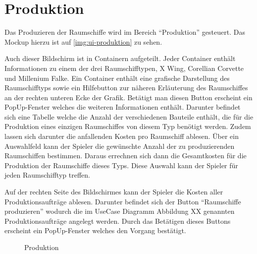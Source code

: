 \section{Produktion}
\label{sec:ui-produktion}

Das Produzieren der Raumschiffe wird im Bereich “Produktion” gesteuert. Das Mockup hierzu ist auf \vref{img:ui-produktion} zu sehen. 

Auch dieser Bildschirm ist in Containern aufgeteilt. Jeder Container enthält Informationen zu einem der drei Raumschifftypen, X Wing, Corellian Corvette und Millenium Falke. Ein Container enthält eine grafische Darstellung des Raumschifftyps sowie ein Hilfebutton zur näheren Erläuterung des Raumschiffes an der rechten unteren Ecke der Grafik. Betätigt man diesen Button erscheint ein PopUp-Fenster welches die weiteren Informationen enthält. Darunter befindet sich eine Tabelle welche die Anzahl der verschiedenen Bauteile enthält, die für die Produktion eines einzigen Raumschiffes von diesem Typ benötigt werden. Zudem lassen sich darunter die anfallenden Kosten pro Raumschiff ablesen. Über ein Auswahlfeld kann der Spieler die gewünschte Anzahl der zu produzierenden Raumschiffen bestimmen. Daraus errechnen sich dann die Gesamtkosten für die Produktion der Raumschiffe dieses Typs. Diese Auswahl kann der Spieler für jeden Raumschifftyp treffen.

Auf der rechten Seite des Bildschirmes kann der Spieler die Kosten aller Produktionsaufträge ablesen. Darunter befindet sich der Button “Raumschiffe produzieren” wodurch die im UseCase Diagramm Abbildung XX genannten Produktionsaufträge angelegt werden. Durch das Betätigen dieses Buttons erscheint ein PopUp-Fenster welches den Vorgang bestätigt. 

\begin{figure}[h]
  \centering
  \caption{Produktion}
  \label{img:ui-produktion}
\end{figure}
